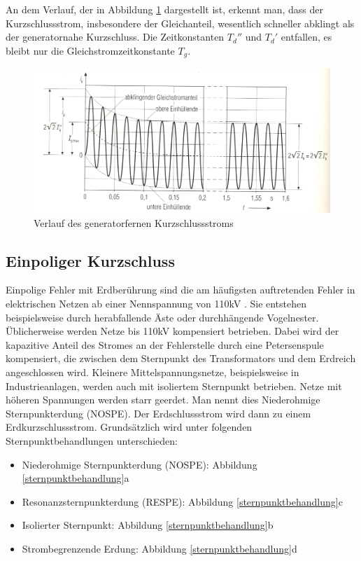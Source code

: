 \documentclass{scrartcl}
\begin{document}
\begin{onehalfspace}
An dem Verlauf, der in Abbildung \ref{kss-verlauf-fern} dargestellt ist, erkennt man, dass der Kurzschlussstrom, insbesondere der Gleichanteil, wesentlich schneller abklingt als der generatornahe Kurzschluss. Die Zeitkonstanten $T_d''$ und $T_d'$ entfallen, es bleibt nur die Gleichstromzeitkonstante $T_g$.

	\begin{figure}[H]
	\centering
	\includegraphics[scale=1]{img/kurzschlussstromverlauf-fern.jpg}
	\caption{Verlauf des generatorfernen Kurzschlussstroms \cite[S. 522]{Oeding2011}}
	\label{kss-verlauf-fern}
	\end{figure}
	
\subsection{Einpoliger Kurzschluss}
Einpolige Fehler mit Erdberührung sind die am häufigsten auftretenden Fehler in elektrischen Netzen ab einer Nennspannung von 110kV \cite[S. 64]{Schlabbach2002}. Sie entstehen beispielsweise durch herabfallende Äste oder durchhängende Vogelnester. Üblicherweise werden Netze bis 110kV kompensiert betrieben. Dabei wird der kapazitive Anteil des Stromes an der Fehlerstelle durch eine Petersenspule kompensiert, die zwischen dem Sternpunkt des Transformators und dem Erdreich angeschlossen wird. Kleinere Mittelspannungsnetze, beispielsweise in Industrieanlagen, werden auch mit isoliertem Sternpunkt betrieben. Netze mit höheren Spannungen werden starr geerdet. Man nennt dies \glqq Niederohmige Sternpunkterdung\grqq{} (NOSPE). Der Erdschlussstrom wird dann zu einem Erdkurzschlussstrom. Grundsätzlich wird unter folgenden Sternpunktbehandlungen unterschieden:

\begin{itemize}
\item Niederohmige Sternpunkterdung (NOSPE): Abbildung \ref{sternpunktbehandlung}a
\item Resonanzsternpunkterdung (RESPE): Abbildung \ref{sternpunktbehandlung}c
\item Isolierter Sternpunkt: Abbildung \ref{sternpunktbehandlung}b
\item Strombegrenzende Erdung: Abbildung \ref{sternpunktbehandlung}d
\end{itemize}


\end{onehalfspace}
\end{document}
